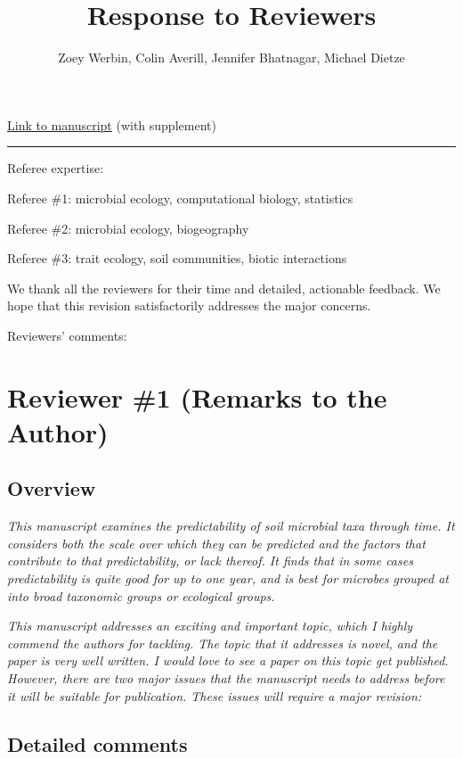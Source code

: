 \documentclass[11pt]{article}
\title{Response to Reviewers}
\author{Zoey Werbin, Colin Averill, Jennifer Bhatnagar, Michael Dietze}
\date{}
\begin{document}
\maketitle

\href{https://docs.google.com/document/d/1SuD6-FiOA-zIBZACd5x7ZjkDE_sT7UG2fEuCYWlSb9Y/edit?usp=sharing}{Link to manuscript} (with supplement)

\bigskip\hrule\bigskip

Referee expertise:

Referee \#1: microbial ecology, computational biology, statistics

Referee \#2: microbial ecology, biogeography

Referee \#3: trait ecology, soil communities, biotic interactions

We thank all the reviewers for their time and detailed, actionable feedback. We hope that this revision satisfactorily addresses the major concerns.

Reviewers' comments:

\section*{Reviewer \#1 (Remarks to the Author)}

\subsection*{Overview}

\textit{This manuscript examines the predictability of soil microbial taxa through time. It considers both the scale over which they can be predicted and the factors that contribute to that predictability, or lack thereof. It finds that in some cases predictability is quite good for up to one year, and is best for microbes grouped at into broad taxonomic groups or ecological groups.}

\textit{This manuscript addresses an exciting and important topic, which I highly commend the authors for tackling. The topic that it addresses is novel, and the paper is very well written. I would love to see a paper on this topic get published. However, there are two major issues that the manuscript needs to address before it will be suitable for publication. These issues will require a major revision:}

\subsection*{Detailed comments}
\end{document}
